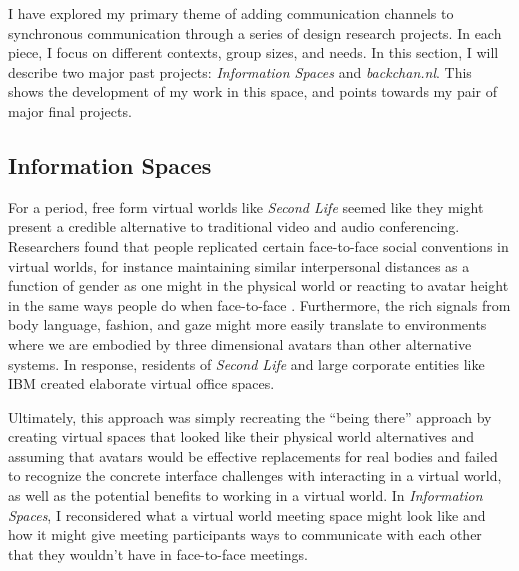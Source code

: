 \documentclass{tufte-handout}
\begin{document}
I have explored my primary theme of adding communication channels to synchronous communication through a series of design research projects. In each piece, I focus on different contexts, group sizes, and needs. In this section, I will describe two major past projects: \emph{Information Spaces} and \emph{backchan.nl}. This shows the development of my work in this space, and points towards my pair of major final projects.


\subsection{Information Spaces}


For a period, free form virtual worlds  like \emph{Second Life} seemed like they might present a credible alternative to traditional video and audio conferencing. Researchers found that people replicated certain face-to-face social conventions in virtual worlds, for instance maintaining similar interpersonal distances as a function of gender as one might in the physical world \citep{Yee:2007cl} or reacting to avatar height in the same ways people do when face-to-face \citep{Yee:2009vt}. Furthermore, the rich signals from body language, fashion, and gaze might more easily translate to environments where we are embodied by three dimensional avatars than other alternative systems. In response, residents of \emph{Second Life} and large corporate entities like IBM \citep{Shami:2010vi} created elaborate virtual office spaces.

Ultimately, this approach was simply recreating the ``being there'' approach by creating virtual spaces that looked like their physical world alternatives and assuming that avatars would be effective replacements for real bodies and failed to recognize the concrete interface challenges with interacting in a virtual world, as well as the potential benefits to working in a virtual world. In \emph{Information Spaces}, I reconsidered what a virtual world meeting space might look like and how it might give meeting participants ways to communicate with each other that they wouldn't have in face-to-face meetings. \citep{Harry:2008ww}
\end{document}
